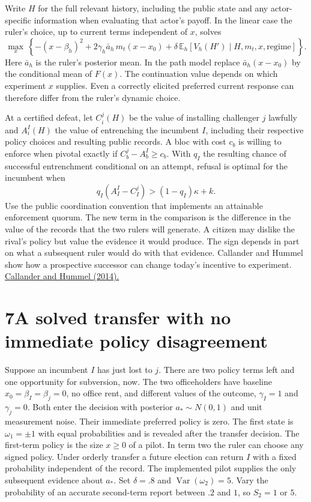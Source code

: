 \documentclass[11pt,letterpaper]{article}
\newcommand{\sect}[1]{\section*{\color{ink}#1}}
\newcommand{\E}{\mathbb E}
\newcommand{\Var}{\operatorname{Var}}
\newcommand{\src}[2]{\href{#1}{#2}}
\begin{document}
Write $H$ for the full relevant history, including the public state and any actor-specific information when evaluating that actor's payoff. In the linear case the ruler's choice, up to current terms independent of $x$, solves
\[
 \max_x\,\left\{-(x-\beta_h)^2+2\gamma_h\bar a_h\,m_t(x-x_0)
       +\delta\,\E_h[V_h(H')\mid H,m_t,x,\text{regime}]\right\}.
\]
Here $\bar a_h$ is the ruler's posterior mean. In the path model replace $\bar a_h(x-x_0)$ by the conditional mean of $F(x)$. The continuation value depends on which experiment $x$ supplies. Even a correctly elicited preferred current response can therefore differ from the ruler's dynamic choice.

At a certified defeat, let $C_i^j(H)$ be the value of installing challenger $j$ lawfully and $A_i^I(H)$ the value of entrenching the incumbent $I$, including their respective policy choices and resulting public records. A bloc with cost $c_b$ is willing to enforce when pivotal exactly if $C_b^j-A_b^I\ge c_b$. With $q_I$ the resulting chance of successful entrenchment conditional on an attempt, refusal is optimal for the incumbent when
\[
 q_I(A_I^I-C_I^j)>(1-q_I)\kappa+k .
\]
Use the public coordination convention that implements an attainable enforcement quorum. The new term in the comparison is the difference in the value of the records that the two rulers will generate. A citizen may dislike the rival's policy but value the evidence it would produce. The sign depends in part on what a subsequent ruler would do with that evidence. Callander and Hummel show how a prospective successor can change today's incentive to experiment. \src{https://doi.org/10.3982/ECTA10616}{Callander and Hummel (2014).}

\newpage
\sect{7\quad A solved transfer with no immediate policy disagreement}
Suppose an incumbent $I$ has just lost to $j$. There are two policy terms left and one opportunity for subversion, now. The two officeholders have baseline $x_0=\beta_I=\beta_j=0$, no office rent, and different values of the outcome, $\gamma_I=1$ and $\gamma_j=0$. Both enter the decision with posterior $a_*\sim N(0,1)$ and unit measurement noise. Their immediate preferred policy is zero. The first state is $\omega_1=\pm1$ with equal probabilities and is revealed after the transfer decision. The first-term policy is the size $x\ge0$ of a pilot. In term two the ruler can choose any signed policy. Under orderly transfer a future election can return $I$ with a fixed probability independent of the record. The implemented pilot supplies the only subsequent evidence about $a_*$. Set $\delta=.8$ and $\Var(\omega_2)=5$. Vary the probability of an accurate second-term report between $.2$ and $1$, so $S_2=1$ or $5$.
\end{document}
